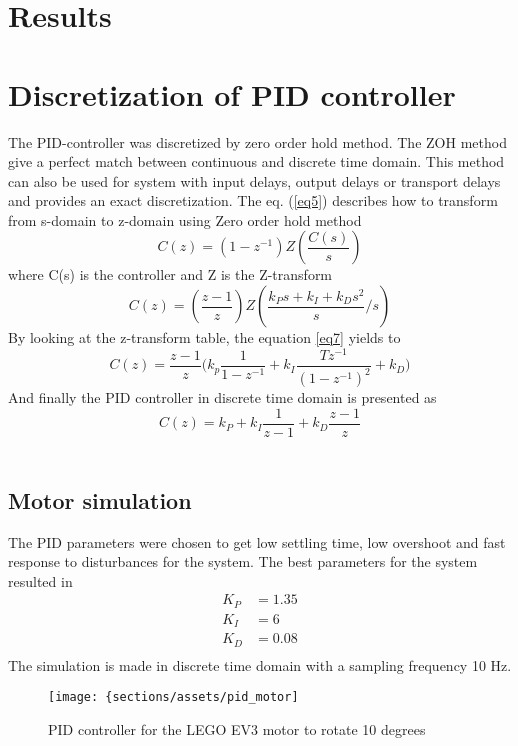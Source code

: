 \section{Results}
\section{Discretization of PID controller}
The PID-controller was discretized by zero order hold method. The ZOH method give a perfect match between continuous and discrete time domain. This method can also be used for system with input delays, output delays or transport delays and provides an exact discretization. 
The eq. (\ref{eq5}) describes how to transform from s-domain to z-domain using Zero order hold method
\begin{equation} \label{eq5}
    C(z)=(1-z^{-1}) Z(\frac{C(s)}{s}) 
\end{equation}
where C(s) is the controller and Z is the Z-transform
\begin{equation}
    C(z)=(\frac{z-1}{z})Z(\frac{k_Ps+k_I+k_Ds^2}{s} \Big/ s)
    \label{eq7}
\end{equation}
By looking at the z-transform table, the equation \ref{eq7} yields to
\begin{equation}
    C(z)=\frac{z-1}{z}\bigg( k_p \frac{1}{1-z^{-1}}+k_I \frac{T z^{-1}}{(1-z^{-1})^2}+k_D\bigg)
\end{equation}
And finally the PID controller in discrete time domain is presented as
\begin{equation}
    C(z)= k_P + k_I \frac{1}{z-1} + k_D \frac{z-1}{z}
\end{equation}\\

\subsection{Motor simulation}
The PID parameters were chosen to get low settling time, low overshoot and fast response to disturbances for the system. The best parameters for the system resulted in 
\begin{equation}
    \begin{split}
        K_P & = 1.35 \\
        K_I & = 6 \\
        K_D & = 0.08 \\
    \end{split}
\end{equation}
The simulation is made in discrete time domain with a sampling frequency 10 Hz.
\begin{figure}[H]
    \centering
    \texttt{[image: \{sections/assets/pid\_motor]}
    \caption{PID controller for the LEGO EV3 motor to rotate 10 degrees}
    \label{fig1}
\end{figure}
